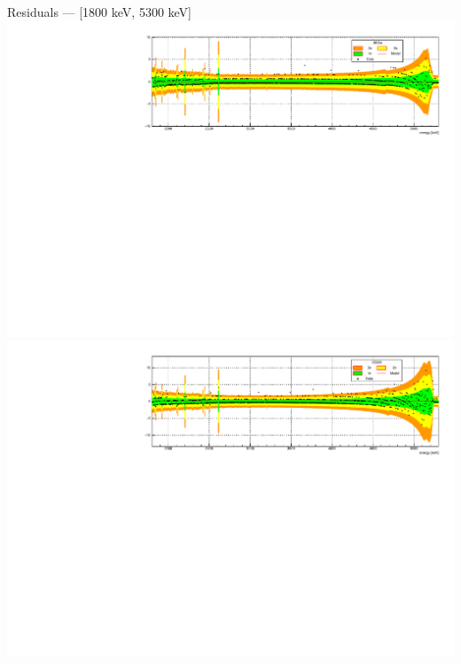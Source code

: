 \documentclass[10pt]{beamer}
\begin{document}
\begin{frame}{Residuals --- [1800 keV, 5300 keV]}
	\centering\includegraphics[height=\textwidth, angle=270]{img/resBEGealpha.pdf} \\
	\centering\includegraphics[height=\textwidth, angle=270]{img/resCOAXalpha.pdf}
\end{frame}
\end{document}
